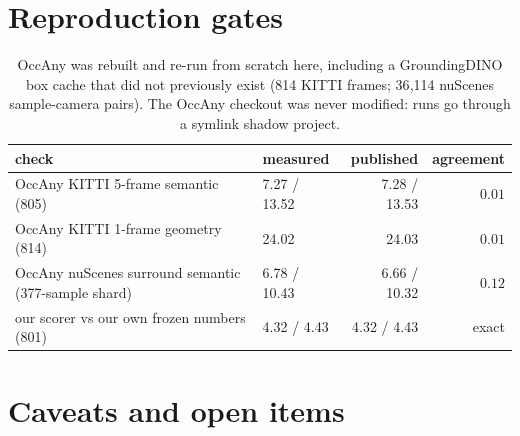 \documentclass[11pt,a4paper]{article}
\begin{document}
\section{Reproduction gates}

\begin{table}[h]\centering
\begin{tabular}{llrr}
\toprule
check & measured & published & agreement \\
\midrule
OccAny KITTI 5-frame semantic (805) & 7.27 / 13.52 & 7.28 / 13.53 & $0.01$ \\
OccAny KITTI 1-frame geometry (814) & 24.02 & 24.03 & $0.01$ \\
OccAny nuScenes surround semantic (377-sample shard) & 6.78 / 10.43 & 6.66 / 10.32 & $0.12$ \\
our scorer vs our own frozen numbers (801) & 4.32 / 4.43 & 4.32 / 4.43 & exact \\
\bottomrule
\end{tabular}
\caption{OccAny was rebuilt and re-run from scratch here, including a GroundingDINO box cache that did
not previously exist (814 KITTI frames; 36{,}114 nuScenes sample-camera pairs). The OccAny checkout was
never modified: runs go through a symlink shadow project.}
\end{table}

\section{Caveats and open items}\label{sec:caveats}
\end{document}
